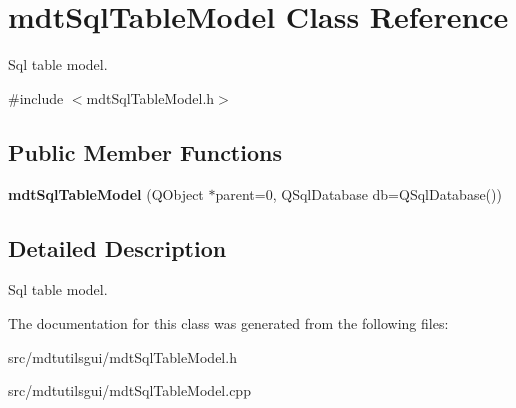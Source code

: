 \hypertarget{classmdt_sql_table_model}{
\section{mdtSqlTableModel Class Reference}
\label{classmdt_sql_table_model}
}


Sql table model.  




{\ttfamily \#include $<$mdtSqlTableModel.h$>$}

\subsection*{Public Member Functions}
\begin{DoxyCompactItemize}
\item 
\hypertarget{classmdt_sql_table_model_ad423c1b0c74ecbbb575637b028c2574b}{
{\bfseries mdtSqlTableModel} (QObject $\ast$parent=0, QSqlDatabase db=QSqlDatabase())}
\label{classmdt_sql_table_model_ad423c1b0c74ecbbb575637b028c2574b}

\end{DoxyCompactItemize}


\subsection{Detailed Description}
Sql table model. 

The documentation for this class was generated from the following files:\begin{DoxyCompactItemize}
\item 
src/mdtutilsgui/mdtSqlTableModel.h\item 
src/mdtutilsgui/mdtSqlTableModel.cpp\end{DoxyCompactItemize}
